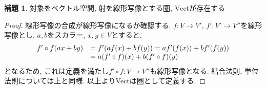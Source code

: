 \documentclass[a4paper]{jsarticle}
\theoremstyle{definition}
\newtheorem{lem}[dfn]{補題}
\newcommand{\Vect}{{\mathrm{Vect}}}
\begin{document}
\begin{lem}
    対象をベクトル空間, 射を線形写像とする圏, $\Vect$が存在する
\end{lem}
\begin{proof}
    線形写像の合成が線形写像になるか確認する. $f:V\rightarrow V'$, $f':V'\rightarrow V''$を線形写像とし, $a, b$をスカラー, $x, y\in V$とすると, 
\begin{equation}
    \begin{array}{ll}
        f'\circ f(ax+by) & =f'(af(x)+bf(y))=af'(f(x))+bf'(f(y)) \\
         & =a(f'\circ f)(x)+b(f'\circ f)(y)\notag
    \end{array}
\end{equation}
となるため, これは定義を満たし$f'\circ f:V\rightarrow V''$も線形写像となる. 結合法則, 単位法則については上と同様. 以上よりVectは圏として定義する.
\end{proof}
\end{document}
